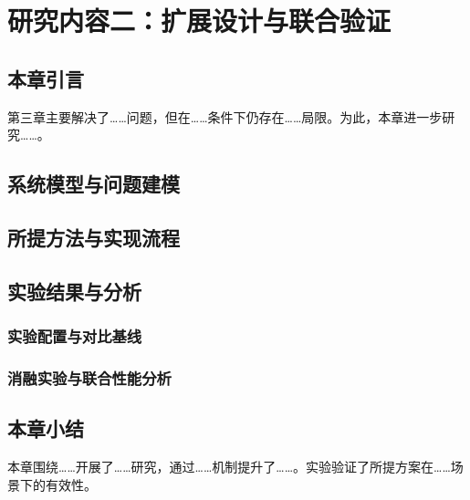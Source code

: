 \chapter{研究内容二：扩展设计与联合验证}

\section{本章引言}
第三章主要解决了……问题，但在……条件下仍存在……局限。为此，本章进一步研究……。

\section{系统模型与问题建模}

\section{所提方法与实现流程}

\section{实验结果与分析}
\subsection{实验配置与对比基线}
\subsection{消融实验与联合性能分析}

\section{本章小结}
本章围绕……开展了……研究，通过……机制提升了……。实验验证了所提方案在……场景下的有效性。

